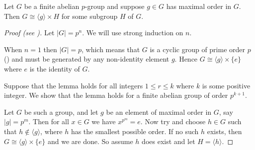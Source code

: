 \begin{lemma}\label{lemma-fundamental-theorem-of-finite-abelian-groups-2}
    Let $G$ be a finite abelian $p$-group and suppose $g \in G$ has maximal order in $G$. Then $G \cong \langle g \rangle \times H$ for some subgroup $H$ of $G$.
\end{lemma}
\begin{proof}[Proof (see {\cite[Lemma 13.9]{judson_beezer_2022}})]
    Let $|G| = p^n$. We will use strong induction on $n$.

    When $n = 1$ then $|G| = p$, which means that $G$ is a cyclic group of prime order $p$ () and must be generated by any non-identity element $g$. Hence $G \cong \langle g \rangle \times \{e\}$ where $e$ is the identity of $G$.

    Suppose that the lemma holds for all integers $1 \leq r \leq k$ where $k$ is some positive integer. We show that the lemma holds for a finite abelian group of order $p^{k+1}$.

    Let $G$ be such a group, and let $g$ be an element of maximal order in $G$, say $|g| = p^m$. Then for all $x \in G$ we have $x^{p^m} = e$. Now try and choose $h \in G$ such that $h \notin \langle g \rangle$, where $h$ has the smallest possible order. If no such $h$ exists, then $G \cong \langle g \rangle \times \{e\}$ and we are done. So assume $h$ does exist and let $H = \langle h \rangle$.


\end{proof}
